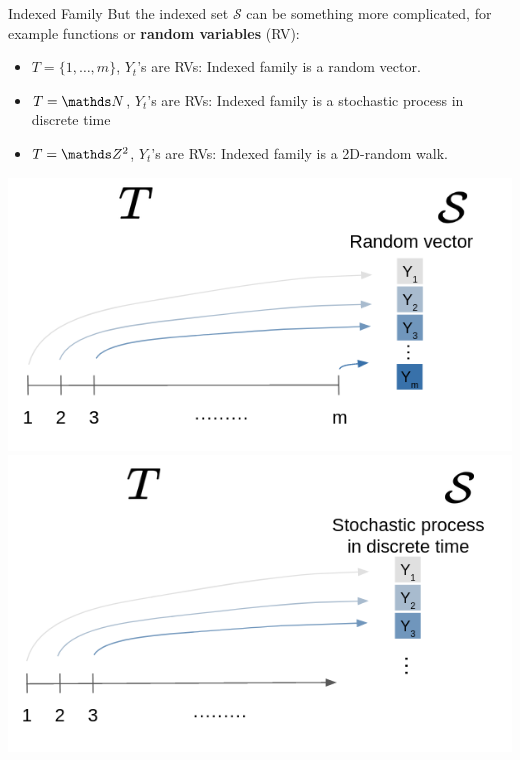 \documentclass[11pt,compress,t,notes=noshow, xcolor=table]{beamer}
\begin{document}
\begin{vbframe}{Indexed Family}
But the indexed set $\mathcal{S}$ can be something more complicated, for example functions or \textbf{random variables} (RV):

\begin{minipage}{0.43\linewidth}
  \vspace*{0.5cm}
  \begin{itemize}
    \item $T = \{1, \dots, m\}$, $Y_t$'s are RVs: Indexed family is a random vector. \vspace*{0.2cm}
    \item $T = \N$, $Y_t$'s are RVs: Indexed family is a stochastic process in discrete time \vspace*{0.2cm}
    \item $T = \Z^2$, $Y_t$'s are RVs: Indexed family is a 2D-random walk.
  \end{itemize}
\end{minipage}\hfill
\begin{minipage}{0.5\linewidth}
\includegraphics{figure_man/indexed_family/indexed_family_4.png} \\
\includegraphics{figure_man/indexed_family/indexed_family_3.png}
\end{minipage}

\end{vbframe}
\end{document}
